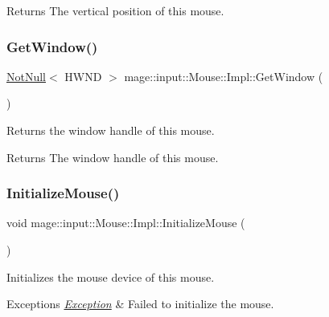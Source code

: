 \begin{DoxyReturn}{Returns}
The vertical position of this mouse. 
\end{DoxyReturn}
\hypertarget{classmage_1_1input_1_1_mouse_1_1_impl_a53b080d8835ebb887fcadbba57131f00}{}\label{classmage_1_1input_1_1_mouse_1_1_impl_a53b080d8835ebb887fcadbba57131f00} 
\subsubsection{\texorpdfstring{Get\+Window()}{GetWindow()}}
{\footnotesize\ttfamily \hyperlink{namespacemage_a8769f9d670d6b585ea306cb1062af94b}{Not\+Null}$<$ H\+W\+ND $>$ mage\+::input\+::\+Mouse\+::\+Impl\+::\+Get\+Window (\begin{DoxyParamCaption}{ }\end{DoxyParamCaption})\hspace{0.3cm}{\ttfamily [noexcept]}}

Returns the window handle of this mouse.

\begin{DoxyReturn}{Returns}
The window handle of this mouse. 
\end{DoxyReturn}
\hypertarget{classmage_1_1input_1_1_mouse_1_1_impl_ae290eaa8d1db619a3123f88e452d382a}{}\label{classmage_1_1input_1_1_mouse_1_1_impl_ae290eaa8d1db619a3123f88e452d382a} 
\subsubsection{\texorpdfstring{Initialize\+Mouse()}{InitializeMouse()}}
{\footnotesize\ttfamily void mage\+::input\+::\+Mouse\+::\+Impl\+::\+Initialize\+Mouse (\begin{DoxyParamCaption}{ }\end{DoxyParamCaption})\hspace{0.3cm}{\ttfamily [private]}}

Initializes the mouse device of this mouse.


\begin{DoxyExceptions}{Exceptions}
{\em \hyperlink{classmage_1_1_exception}{Exception}} & Failed to initialize the mouse. \\
\hline
\end{DoxyExceptions}
\hypertarget{classmage_1_1input_1_1_mouse_1_1_impl_a7ca0f042e7d201c312ab26f4bb9e0604}{}\label{classmage_1_1input_1_1_mouse_1_1_impl_a7ca0f042e7d201c312ab26f4bb9e0604} 
